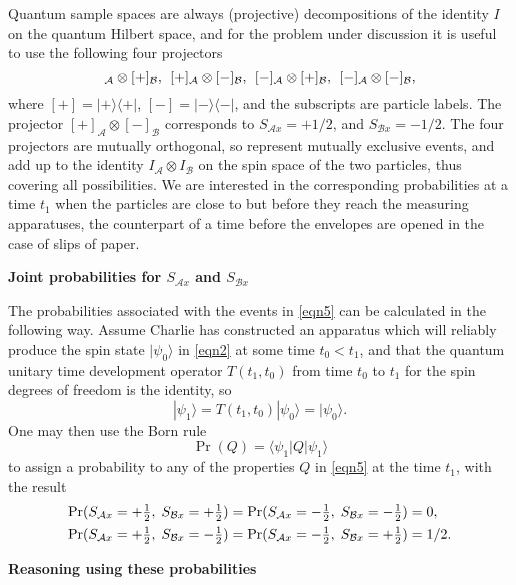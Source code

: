 \documentclass[12pt]{article} %
\def\outl#1{\par{\medskip\noindent\hspace*{.5cm}\bf
      \mathversion{bold}#1\mathversion{normal}\smallskip} }
\def\np{} \def\xa{} \def\xb{} \def\xn{} \def\xp{}
\def\outl#1{} \def\np{} \def\xa{} \def\xb{} \def\xn{} \def\xp{}
\def\outl#1{\par{\medskip\noindent\hspace*{.5cm}\bf
      \mathversion{bold}#1\mathversion{normal}\smallskip} }
\def\np{\newpage }\def\xn{\nopagebreak }\def\xp{\pagebreak }
\newcommand{\dya}[1]{|#1\rgl\lgl#1|}
\newcommand{\hf}{{\textstyle\frac{1}{2} }}
\newcommand{\hquad}{\mspace{8 mu}}
\newcommand{\ket}[1]{|#1\rgl }
\newcommand{\lgl}{\langle }
\newcommand{\mte}[2]{\lgl#1|#2|#1\rgl }
\newcommand{\ot}{\otimes }
\newcommand{\rgl}{\rangle }
\newcommand{\AM}{{\mathcal A}}
\newcommand{\BM}{{\mathcal B}}
\begin{document}
Quantum sample spaces are always (projective) decompositions of the identity
$I$ on the quantum Hilbert space,
and for the problem under discussion it is useful to use the following 
four projectors
\begin{equation}
  [+]_\AM\ot [+]_\BM,\hquad [+]_\AM\ot [-]_\BM,\hquad [-]_\AM\ot [+]_\BM,
\hquad  [-]_\AM\ot [-]_\BM, 
\label{eqn5}
\end{equation}
where $[+] =\dya{+}$, $[-] =\dya{-}$, and the subscripts are particle
labels. The projector $[+]_\AM\ot[-]_\BM$ corresponds to $S_{\AM x}=+1/2$, and
$S_{\BM x}=-1/2$. The four projectors are mutually orthogonal, so represent
mutually exclusive events, and add up to the identity $I_\AM\ot I_\BM$ on the
spin space of the two particles, thus covering all possibilities. We are
interested in the corresponding probabilities at a time $t_1$ when the
particles are close to but before they reach the measuring apparatuses, the
counterpart of a time before the envelopes are opened in the case of slips of
paper.

\xb
\outl{Joint probabilities for $S_{\AM x}$ and $S_{\BM x}$}
\xa



The probabilities associated with the events in \eqref{eqn5} can be calculated
in the following way.  Assume Charlie has constructed an apparatus which will
reliably produce the spin state $\ket{\psi_0}$ in \eqref{eqn2} at some time
$t_0 < t_1$, and that the quantum unitary time development operator
$T(t_1,t_0)$ from time $t_0$ to $t_1$ for the spin degrees of freedom is the
identity, so
\begin{equation}
\ket{\psi_1} = T(t_1,t_0)\ket{\psi_0} = \ket{\psi_0}.  
\label{eqn6}
\end{equation}
One may then use the Born rule
\begin{equation}
  \Pr(Q) = \mte{\psi_1}{Q}
\label{eqn7}
\end{equation}
to assign a probability to any of the properties $Q$ in \eqref{eqn5} at the
time $t_1$, with the result 
\begin{align}
  \Pr(S_{\AM x}&=+\hf,\;S_{\BM x}=+\hf)  = 
 \Pr(S_{\AM x}=-\hf,\;S_{\BM x}=-\hf) = 0,
\notag\\ 
 \Pr(S_{\AM x}&=+\hf,\;S_{\BM x}=-\hf) =
 \Pr(S_{\AM x}=-\hf,\;S_{\BM x}=+\hf)  = 1/2.
\label{eqn8}
\end{align}

\xb
\outl{Reasoning using these probabilities}
\xa
\end{document}
